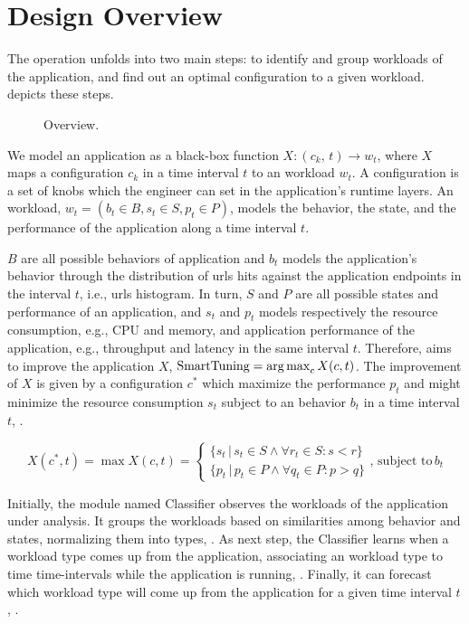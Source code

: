 \section{Design Overview}

The \name operation unfolds into two main steps: to identify and group workloads of the application, and find out an
optimal configuration to a given workload.  depicts these steps.

\begin{figure*}[htp]
    \centering
    \def\svgwidth{\textwidth}
    \scalebox{1.0}{}
    \caption{\name Overview.}
    \label{fig:design-overview}
\end{figure*}

We model an application as a black-box function $X: (c_k,\, t) \rightarrow w_t$, where $X$ maps a configuration $c_k$
in a time interval $t$ to an workload $w_t$.  A configuration is a set of knobs which the engineer can set in the
application's runtime layers. An workload, $w_{t} = (b_t \in B, s_t \in S, p_t \in P)$, models the behavior, the state,
and the performance of the application along a time interval $t$.

$B$ are all possible behaviors of application and $b_t$ models the application's behavior through the distribution of
urls hits against the application endpoints in the interval $t$, i.e., urls histogram. In turn, $S$ and $P$ are all
possible states and performance of an application, and $s_t$ and $p_t$ models respectively the resource consumption,
e.g., CPU and memory, and application performance of the application, e.g., throughput and latency in the same interval
$t$. Therefore, \name aims to improve the application $X$, $\text{SmartTuning} = \operatorname*{arg\,max}_c X(c, t)$. The improvement of $X$
is given by a configuration $c^*$ which maximize the performance $p_t$ and might minimize the resource consumption
$s_t$ subject to an behavior $b_t$ in a time interval $t$, .

\begin{equation}
  X(c^{*}, t) = \max{X(c, t)} =
  \begin{cases}
    \{s_t\, | \,s_t \in S \land \forall r_t \in S: s < r\} \\
    \{p_t\, | \,p_t \in P \land \forall q_t \in P: p > q\}
  \end{cases},\, \text{subject to}\, b_t
  \label{eq:optimization}
\end{equation}

Initially, the module named Classifier observes the workloads of the application under analysis. It groups the
workloads based on similarities among behavior and states, normalizing them into types, . As next step,
the Classifier learns when a workload type comes up from the application, associating an workload type to time
time-intervals while the application is running, . Finally, it can forecast which workload type will
come up from the application for a given time interval $t$, .

